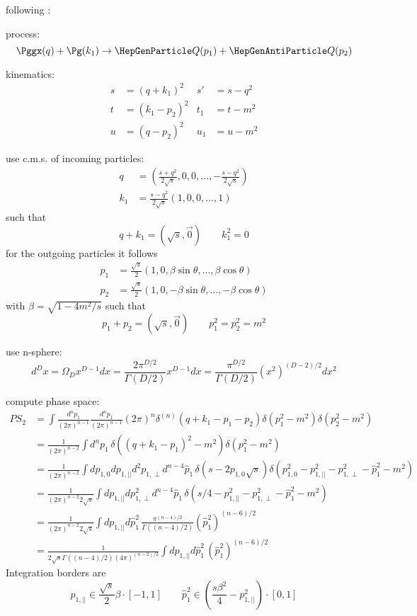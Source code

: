 following \cite{Marco}:

process:
\begin{equation}
\Pggx(q) + \Pg(k_1) \rightarrow \PQ(p_1)+\PaQ(p_2)
\end{equation}

kinematics:
\begin{align}
s &= (q+k_1)^2 &s' &=s-q^2\\
t &= (k_1-p_2)^2 &t_1 &= t-m^2\\
u &= (q-p_2)^2 &u_1 &= u-m^2
\end{align}

use c.m.s. of incoming particles:
\begin{align}
q &= \left(\frac {s+q^2}{2\sqrt s},0,0,\ldots,-\frac{s-q^2}{2\sqrt s}\right) \\
k_1 &= \frac {s-q^2}{2\sqrt s}\left(1,0,0,\ldots,1\right)
\end{align}
such that
\begin{equation}
q+k_1 = (\sqrt s,\vec 0)\qquad k_1^2 = 0
\end{equation}
for the outgoing particles it follows
\begin{align}
p_1 &= \frac{\sqrt s} 2 \left(1,0,\beta\sin\theta,\ldots,\beta\cos\theta\right)\\
p_2 &= \frac{\sqrt s} 2 \left(1,0,-\beta\sin\theta,\ldots,-\beta\cos\theta\right)
\end{align}
with $\beta = \sqrt{1-4m^2/s}$ such that
\begin{equation}
p_1+p_2 = (\sqrt s,\vec 0)\qquad p_1^2 = p_2^2 = m^2
\end{equation}

use n-sphere:
\begin{equation}
d^Dx = \Omega_D x^{D-1} dx = \frac{2\pi^{D/2}}{\Gamma(D/2)}x^{D-1} dx= \frac{\pi^{D/2}}{\Gamma(D/2)}(x^2)^{(D-2)/2} dx^2
\end{equation}

compute phase space:
\begin{align}
PS_2 &= \int\!\!\frac{d^np_1}{(2\pi)^{n-1}}\frac{d^np_1}{(2\pi)^{n-1}} (2\pi)^n\delta^{(n)}(q+k_1-p_1-p_2)\delta(p_1^2-m^2)\delta(p_2^2 - m^2)\\
 &= \frac 1 {(2\pi)^{n-2}}\int\!\!d^np_1\,\delta((q+k_1-p_1)^2 -m^2) \delta(p_1^2-m^2)\\
 &= \frac 1 {(2\pi)^{n-2}}\int\!\!dp_{1,0}dp_{1,||}d^2p_{1,\perp}d^{n-4}\hat p_1\,\delta(s-2p_{1,0}\sqrt s) \delta(p_{1,0}^2-p_{1,||}^2 - p_{1,\perp}^2 - \hat p_1^2-m^2)\\
 &= \frac 1 {(2\pi)^{n-2} 2\sqrt s}\int\!\!dp_{1,||}dp^2_{1,\perp}d^{n-4}\hat p_1\,\delta(s/4-p_{1,||}^2 - p_{1,\perp}^2 - \hat p_1^2-m^2)\\
 &= \frac 1 {(2\pi)^{n-2} 2\sqrt s}\int\!\!dp_{1,||}d\hat p_1^2\,\frac{\pi^{(n-4)/2}}{\Gamma((n-4)/2)}(\hat p_1^2)^{(n-6)/2}\\
 &= \frac 1 {2\sqrt s\Gamma((n-4)/2)(4\pi)^{(n-2)/2}}\int\!\!dp_{1,||}d\hat p_1^2\,(\hat p_1^2)^{(n-6)/2}
\end{align}
Integration borders are
\begin{equation}
p_{1,||} \in \frac {\sqrt s} 2\beta \cdot [-1,1] \qquad \hat p_1^2 \in \left(\frac{s \beta^2}{4}-p_{1,||}^2\right)\cdot [0,1]
\end{equation}

